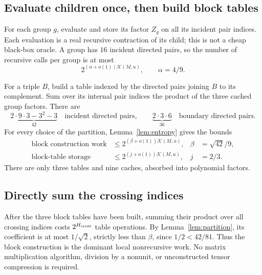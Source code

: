 \documentclass[11pt]{article}
\theoremstyle{definition}\newtheorem{definition}[theorem]{Definition}
\theoremstyle{remark}\newtheorem{remark}[theorem]{Remark}
\newcommand{\K}{\mathcal K}
\begin{document}
\subsection{Evaluate children once, then build block tables}

For each group $g$, evaluate and store its factor $Z_g$ on all its incident
pair indices. Each evaluation is a real recursive contraction of its child;
this is not a cheap black-box oracle. A group has $16$ incident directed
pairs, so the number of recursive calls per group is at most
\begin{equation}
 2^{(\alpha+o(1))\K(M,u)},\qquad \alpha=4/9.\label{eq:alpha}
\end{equation}

For a triple $B$, build a table indexed by the directed pairs joining $B$
to its complement. Sum over its internal pair indices the product of the
three cached group factors. There are
\[
 \underbrace{2\cdot9\cdot3-3^2-3}_{42}
 \quad\text{incident directed pairs},\qquad
 \underbrace{2\cdot3\cdot6}_{36}
 \quad\text{boundary directed pairs}.
\]
For every choice of the partition, Lemma~\ref{lem:entropy} gives the bounds
\begin{align}
 \text{block construction work}&\le
 2^{(\beta+o(1))\K(M,u)},&\beta&=\sqrt{42}/9,\label{eq:beta}\\
 \text{block-table storage}&\le
 2^{(j+o(1))\K(M,u)},&j&=2/3.\label{eq:j}
\end{align}
There are only three tables and nine caches, absorbed into polynomial factors.

\subsection{Directly sum the crossing indices}

After the three block tables have been built, summing their product over all
crossing indices costs $2^{H_{\rm cross}}$ table operations. By
Lemma~\ref{lem:partition}, its coefficient is at most $1/\sqrt2$, strictly
less than $\beta$, since $1/2<42/81$. Thus the block construction is the
dominant local nonrecursive work. No matrix multiplication algorithm,
division by a nonunit, or unconstructed tensor compression is required.
\end{document}
